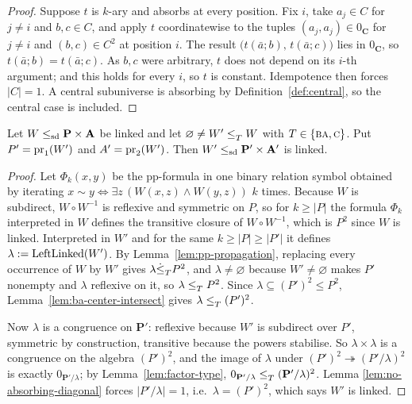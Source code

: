 \begin{proof}
Suppose $t$ is $k$-ary and absorbs at every position. Fix $i$, take
$a_{j}\in C$ for $j\neq i$ and $b,c\in C$, and apply $t$ coordinatewise to the
tuples $(a_{j},a_{j})\in 0_{\mathbf C}$ for $j\neq i$ and $(b,c)\in C^{2}$ at
position $i$. The result
$\bigl(t(\bar a;b),\,t(\bar a;c)\bigr)$ lies in $0_{\mathbf C}$, so
$t(\bar a;b)=t(\bar a;c)$. As $b,c$ were arbitrary, $t$ does not depend on its
$i$-th argument; and this holds for every $i$, so $t$ is constant. Idempotence
then forces $|C|=1$. A central subuniverse is absorbing by
Definition~\ref{def:central}, so the central case is included.
\end{proof}

\begin{lemma}\label{lem:absorb-linked-sub}
Let $W\le_{\mathrm{sd}}\mathbf P\times\mathbf A$ be linked and let
$\varnothing\neq W'\le_{T}^{}W$ with $T\in\{\textup{\textsc{ba}},\textup{\textsc{c}}\}$. Put
$P'=\operatorname*{pr}_{1}(W')$ and $A'=\operatorname*{pr}_{2}(W')$. Then $W'\le_{\mathrm{sd}}\mathbf P'\times
\mathbf A'$ is linked.
\end{lemma}

\begin{proof}
Let $\Phi_{k}(x,y)$ be the pp-formula in one binary relation symbol obtained by
iterating $x\sim y\iff\exists z\,(W(x,z)\wedge W(y,z))$ $k$ times. Because $W$
is subdirect, $W\circ W^{-1}$ is reflexive and symmetric on $P$, so for
$k\ge|P|$ the formula $\Phi_{k}$ interpreted in $W$ defines the transitive
closure of $W\circ W^{-1}$, which is $P^{2}$ since $W$ is linked. Interpreted
in $W'$ and for the same $k\ge|P|\ge|P'|$ it defines
$\lambda:=\operatorname{LeftLinked}(W')$. By Lemma~\ref{lem:pp-propagation},
replacing every occurrence of $W$ by $W'$ gives $\lambda\dot\le_{T}^{}P^{2}$, and
$\lambda\neq\varnothing$ because $W'\neq\varnothing$ makes $P'$ nonempty and
$\lambda$ reflexive on it, so $\lambda\le_{T}^{}P^{2}$. Since
$\lambda\subseteq (P')^{2}\le P^{2}$, Lemma~\ref{lem:ba-center-intersect} gives
$\lambda\le_{T}^{}(P')^{2}$.

Now $\lambda$ is a congruence on $\mathbf P'$: reflexive because $W'$ is
subdirect over $P'$, symmetric by construction, transitive because the powers
stabilise. So $\lambda\times\lambda$ is a congruence on the algebra $(P')^{2}$,
and the image of $\lambda$ under $(P')^{2}\twoheadrightarrow(P'/\lambda)^{2}$ is
exactly $0_{\mathbf P'/\lambda}$; by Lemma~\ref{lem:factor-type},
$0_{\mathbf P'/\lambda}\le_{T}^{}(\mathbf P'/\lambda)^{2}$. Lemma
\ref{lem:no-absorbing-diagonal} forces $|P'/\lambda|=1$, i.e.\
$\lambda=(P')^{2}$, which says $W'$ is linked.
\end{proof}

